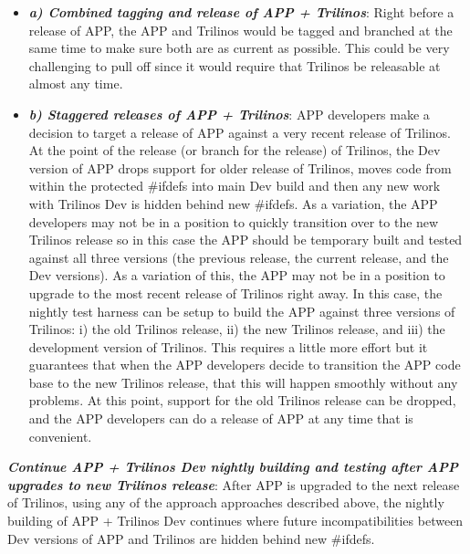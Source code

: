 \documentclass[pdf,ps2pdf,11pt]{SANDreport}
\begin{document}
    \begin{itemize}

    {}\item\textit{\textbf{a) Combined tagging and release of APP +
    Trilinos}}: Right before a release of APP, the APP and Trilinos would be
    tagged and branched at the same time to make sure both are as current as
    possible.  This could be very challenging to pull off since it would
    require that Trilinos be releasable at almost any time.

    {}\item\textit{\textbf{b) Staggered releases of APP + Trilinos}}: APP
    developers make a decision to target a release of APP against a very
    recent release of Trilinos.  At the point of the release (or branch for
    the release) of Trilinos, the Dev version of APP drops support for older
    release of Trilinos, moves code from within the protected {}\#ifdefs into
    main Dev build and then any new work with Trilinos Dev is hidden behind
    new {}\#ifdefs.  As a variation, the APP developers may not be in a
    position to quickly transition over to the new Trilinos release so in this
    case the APP should be temporary built and tested against all three
    versions (the previous release, the current release, and the Dev
    versions).  As a variation of this, the APP may not be in a position to
    upgrade to the most recent release of Trilinos right away.  In this case,
    the nightly test harness can be setup to build the APP against three
    versions of Trilinos: i) the old Trilinos release, ii) the new Trilinos
    release, and iii) the development version of Trilinos.  This requires a
    little more effort but it guarantees that when the APP developers decide
    to transition the APP code base to the new Trilinos release, that this will
    happen smoothly without any problems.  At this point, support for the old
    Trilinos release can be dropped, and the APP developers can do a release
    of APP at any time that is convenient.

    \end{itemize}

{}\textit{\textbf{Continue APP + Trilinos Dev nightly building and testing
after APP upgrades to new Trilinos release}}: After APP is upgraded to the next
release of Trilinos, using any of the approach approaches described above, the
nightly building of APP + Trilinos Dev continues where future
incompatibilities between Dev versions of APP and Trilinos are hidden behind
new {}\#ifdefs.
\end{document}
